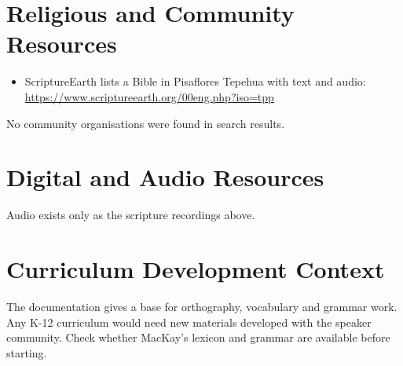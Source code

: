 \documentclass[12pt]{article}
\begin{document}
\section{Religious and Community Resources}
\begin{itemize}
\item ScriptureEarth lists a Bible in Pisaflores Tepehua with text and audio: \url{https://www.scriptureearth.org/00eng.php?iso=tpp}
\end{itemize}
No community organisations were found in search results.

\section{Digital and Audio Resources}
Audio exists only as the scripture recordings above.

\section{Curriculum Development Context}
The documentation gives a base for orthography, vocabulary and grammar work. Any K-12 curriculum would need new materials developed with the speaker community. Check whether MacKay's lexicon and grammar are available before starting.
\end{document}
